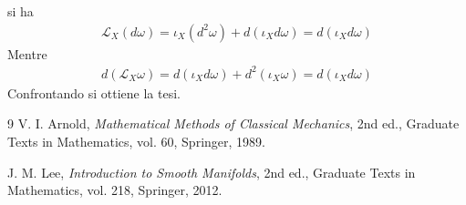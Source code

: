 \documentclass[oneside, 11pt]{amsbook}
\makeatletter
\newcommand{\0}{{(0)}}
\newcommand{\3}{{(3)}}
\theoremstyle{colonplain}
\theoremstyle{colondefinition}
\theoremstyle{colonremark}
\numberwithin{equation}{chapter}
\renewcommand{\proofname}{Dimostrazione}
\renewenvironment{proof}[1][\proofname]{\par
  \pushQED{\qed}%
  \normalfont \topsep6\p@\@plus6\p@\relax
  \trivlist
  \item[\hskip\labelsep\bfseries #1:]\ignorespaces
}{%
  \popQED\endtrivlist\@endpefalse
}
\makeatother
\begin{document}
\begin{proof} si ha
\begin{align}
    \mathcal{L}_X(d\omega) = \iota_X(d^2\omega) + d(\iota_X d\omega) = d(\iota_X d\omega)
\end{align}
Mentre
\begin{align}
    d\left(\mathcal{L}_X\omega\right) = d(\iota_X d\omega) + d^2(\iota_X \omega) = d(\iota_X d\omega)
\end{align}
Confrontando si ottiene la tesi.
\end{proof}

\begin{thebibliography}{9}
V. I. Arnold, \emph{Mathematical Methods of Classical Mechanics}, 2nd ed.,
Graduate Texts in Mathematics, vol. 60, Springer, 1989.

J. M. Lee, \emph{Introduction to Smooth Manifolds}, 2nd ed.,
Graduate Texts in Mathematics, vol. 218, Springer, 2012.
\end{thebibliography}
\end{document}
